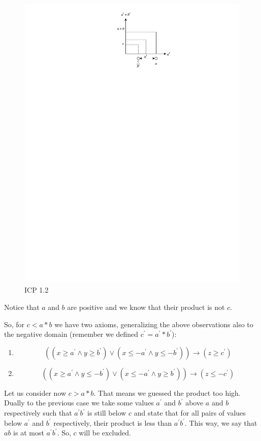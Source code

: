 \begin{figure}[ht!]
  \centering
  \includegraphics[width=0.6\linewidth]{./figures/ICP1_2.pdf}
  \caption{ICP 1.2}
  \label{fig:FixBModifyA}
\end{figure}

\noindent  Notice that $a$ and $b$ are positive and we know that their product is not $c$.\newline

\noindent  So, for $c < a \ast b$ we have two axioms, generalizing the above observations also to the negative domain (remember we defined $c^\prime = a^\prime \ast b^\prime$):

\begin{enumerate}
    \item $$((x \geq a^\prime \wedge y \geq b^\prime) \vee (x \leq -a^\prime \wedge y \leq -b^\prime)) \to (z \geq c^\prime)$$
    \item $$((x \geq a^\prime \wedge y \leq -b^\prime) \vee (x \leq -a^\prime \wedge y \geq b^\prime)) \to (z \leq -c^\prime)$$
\end{enumerate}

\noindent  Let us consider now $c > a \ast b$.
That means we guessed the product too high.
Dually to the previous case we take some values $a^\prime$ and $b^\prime$ above $a$ and $b$ respectively such that $a^\prime b^\prime$ is still below $c$ and state that for all pairs of values below $a^\prime$ and $b^\prime$ respectively, their product is less than $a^\prime b^\prime$.
This way, we say that $ab$ is at most $a^\prime b^\prime$.
So, $c$ will be excluded.\newline

